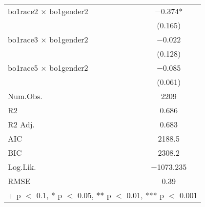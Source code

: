 \documentclass[12pt,english]{article}
\begin{document}
\begin{table}
{\begin{tabular}[t]{lc}
bo1race2 × bo1gender2 & \num{-0.374}*\\
 & (\num{0.165})\\
bo1race3 × bo1gender2 & \num{-0.022}\\
 & (\num{0.128})\\
bo1race5 × bo1gender2 & \num{-0.085}\\
 & (\num{0.061})\\
\midrule
Num.Obs. & \num{2209}\\
R2 & \num{0.686}\\
R2 Adj. & \num{0.683}\\
AIC & \num{2188.5}\\
BIC & \num{2308.2}\\
Log.Lik. & \num{-1073.235}\\
RMSE & \num{0.39}\\
\bottomrule
\multicolumn{2}{l}{\rule{0pt}{1em}+ p $<$ 0.1, * p $<$ 0.05, ** p $<$ 0.01, *** p $<$ 0.001}\\
\end{tabular}
}
\end{table}
\end{document}
